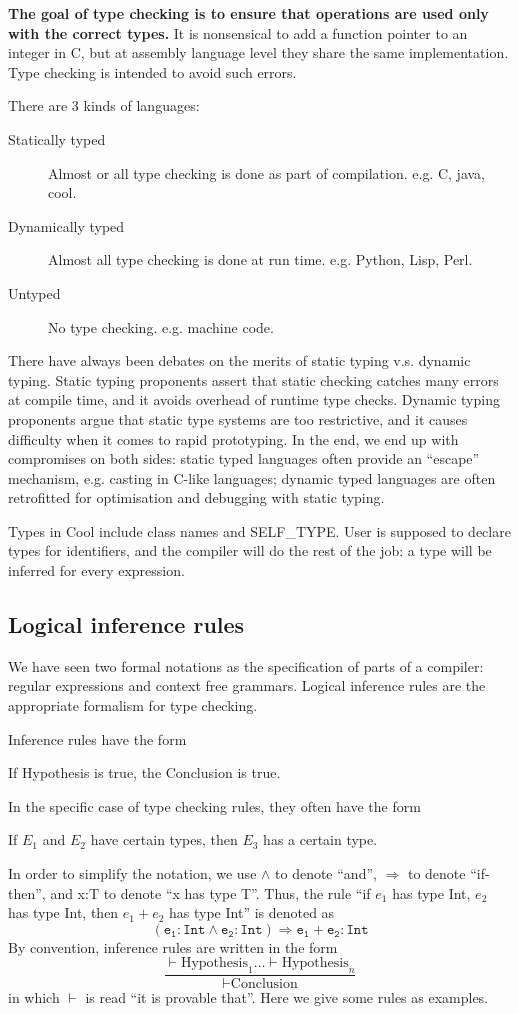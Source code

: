 {\bf The goal of type checking is to ensure that operations are used only with the correct types. }It is nonsensical to add a function pointer to an integer in C, but at assembly language level they share the same implementation. Type checking is intended to avoid such errors.

There are 3 kinds of languages: 
\begin{description}
\item[Statically typed]Almost or all type checking is done as part of compilation. e.g. C, java, cool.
\item[Dynamically typed]Almost all type checking is done at run time. e.g. Python, Lisp, Perl.
\item[Untyped]No type checking. e.g. machine code.
\end{description}
There have always been debates on the merits of static typing v.s. dynamic typing. Static typing proponents assert that static checking catches many errors at compile time, and it avoids overhead of runtime type checks. Dynamic typing proponents argue that static type systems are too restrictive, and it causes difficulty when it comes to rapid prototyping. In the end, we end up with compromises on both sides: static typed languages often provide an ``escape'' mechanism, e.g. casting in C-like languages; dynamic typed languages are often retrofitted for optimisation and debugging with static typing. 

Types in Cool include class names and SELF\_TYPE. User is supposed to declare types for identifiers, and the compiler will do the rest of the job: a type will be inferred for every expression. 
\subsection{Logical inference rules}
We have seen two formal notations as the specification of parts of a compiler: regular expressions and context free grammars. Logical inference rules are the appropriate formalism for type checking. 

Inference rules have the form
\begin{center}
If Hypothesis is true, the Conclusion is true. 
\end{center}
In the specific case of type checking rules, they often have the form
\begin{center}
If $E_1$ and $E_2$ have certain types, then $E_3$ has a certain type. 
\end{center}
In order to simplify the notation, we use $\land$ to denote ``and'', $\Rightarrow$ to denote ``if-then'', and x:T to denote ``x has type T''. Thus, the rule ``if $e_1$ has type Int, $e_2$ has type Int, then $e_1+e_2$ has type Int'' is denoted as 
\begin{equation*}
\mathtt{(e_1:Int\land e_2:Int)\Rightarrow e_1+e_2:Int}
\end{equation*}
By convention, inference rules are written in the form
\begin{equation*}
\frac{\vdash\text{Hypothesis}_1\dots\vdash\text{Hypothesis}_n}{\vdash\text{Conclusion}}
\end{equation*}
in which $\vdash$ is read ``it is provable that''. Here we give some rules as examples.

